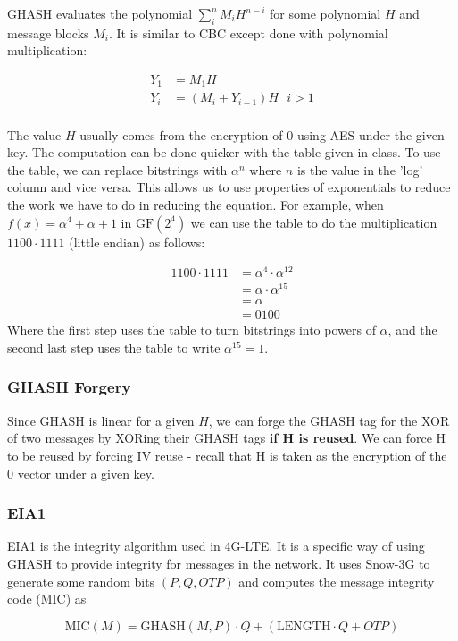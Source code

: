 \documentclass[11pt]{report}
\begin{document}
GHASH evaluates the polynomial $\sum_{i}^n M_iH^{n-i}$ for some polynomial $H$ and message blocks $M_i$. It is similar to CBC except done with polynomial multiplication:

\begin{align*}
	Y_1 &= M_1 H \\
	Y_i &= (M_i + Y_{i-1})H \ \ \ i > 1\\
\end{align*}

The value $H$ usually comes from the encryption of $0$ using AES under the given key. The computation can be done quicker with the table given in class. To use the table, we can replace bitstrings with $\alpha^n$ where $n$ is the value in the 'log' column and vice versa. This allows us to use properties of exponentials to reduce the work we have to do in reducing the equation. For example, when $f(x) = \alpha^4 + \alpha + 1$ in $\text{GF}(2^4)$ we can use the table to do the multiplication $1100 \cdot 1111$ (little endian) as follows:

\begin{align*}
	1100 \cdot 1111 &= \alpha^4 \cdot \alpha^{12} \\
					&= \alpha \cdot \alpha^{15} \\
					&= \alpha \\
					&= 0100
\end{align*}
Where the first step uses the table to turn bitstrings into powers of $\alpha$, and the second last step uses the table to write $\alpha^{15} = 1$.

\subsubsection{GHASH Forgery}
Since GHASH is linear for a given $H$, we can forge the GHASH tag for the XOR of two messages by XORing their GHASH tags \textbf{if H is reused}. We can force H to be reused by forcing IV reuse - recall that H is taken as the encryption of the 0 vector under a given key.


\subsubsection{EIA1}
EIA1 is the integrity algorithm used in 4G-LTE. It is a specific way of using GHASH to provide integrity for messages in the network. It uses Snow-3G to generate some random bits $(P, Q, OTP)$ and computes the message integrity code (MIC) as

\begin{equation}
	\text{MIC}(M) = \text{GHASH}(M, P)\cdot Q + (\text{LENGTH}\cdot Q + OTP)
\end{equation}
\end{document}
